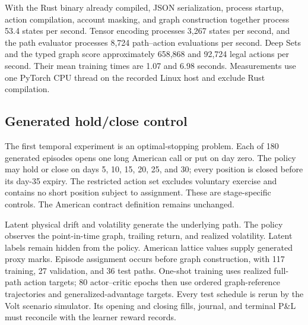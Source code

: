 \documentclass{strategynet-journal}
\newcommand{\VOLT}{\textsf{Volt}}
\begin{document}
With the Rust binary already compiled, JSON serialization, process startup,
action compilation, account masking, and graph construction together process
53.4 states per second.  Tensor encoding processes 3,267 states per second,
and the path evaluator processes 8,724 path--action evaluations per second.
Deep Sets and the typed graph score approximately 658,868 and 92,724 legal
actions per second.  Their mean training times are 1.07 and 6.98 seconds.
Measurements use one PyTorch CPU thread on the recorded Linux host and exclude
Rust compilation.

\subsection{Generated hold/close control}

The first temporal experiment is an optimal-stopping problem.  Each of 180
generated episodes opens one long American call or put on day zero.  The
policy may hold or close on days 5, 10, 15, 20, 25, and 30; every position is
closed before its day-35 expiry.  The restricted action set excludes voluntary
exercise and contains no short position subject to assignment.  These are
stage-specific controls.  The American contract definition remains unchanged.

Latent physical drift and volatility generate the underlying path.  The
policy observes the point-in-time graph, trailing return, and realized
volatility.  Latent labels remain hidden from the policy.  American lattice values supply
generated proxy marks.  Episode assignment occurs before graph construction,
with 117 training, 27 validation, and 36 test paths.  One-shot training uses
realized full-path action targets; 80 actor--critic epochs then use ordered
graph-reference trajectories and generalized-advantage targets.  Every test
schedule is rerun by the \VOLT{} scenario simulator.  Its opening and closing
fills, journal, and terminal P\&L must reconcile with the learner reward
records.
\end{document}
